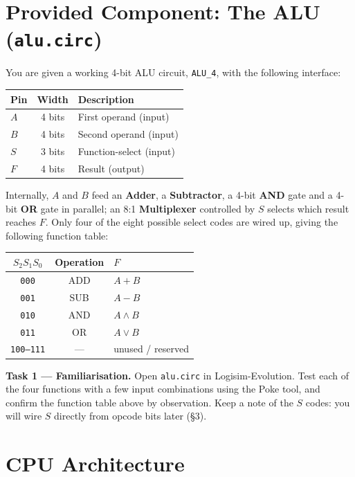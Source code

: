 \documentclass[11pt,a4paper]{article}
\newcommand{\task}[1]{\par\vspace{4pt}\noindent\textbf{Task #1}}
\begin{document}
\section{Provided Component: The ALU (\texttt{alu.circ})}

You are given a working 4-bit ALU circuit, \texttt{ALU\_4}, with the following
interface:

\begin{center}
\begin{tabular}{@{}lcl@{}}
\toprule
\textbf{Pin} & \textbf{Width} & \textbf{Description} \\
\midrule
$A$ & 4 bits & First operand (input) \\
$B$ & 4 bits & Second operand (input) \\
$S$ & 3 bits & Function-select (input) \\
$F$ & 4 bits & Result (output) \\
\bottomrule
\end{tabular}
\end{center}

Internally, $A$ and $B$ feed an \textbf{Adder}, a \textbf{Subtractor}, a 4-bit
\textbf{AND} gate and a 4-bit \textbf{OR} gate in parallel; an 8:1
\textbf{Multiplexer} controlled by $S$ selects which result reaches $F$. Only
four of the eight possible select codes are wired up, giving the following
function table:

\begin{center}
\begin{tabular}{@{}ccl@{}}
\toprule
$S_2 S_1 S_0$ & Operation & $F$ \\
\midrule
\texttt{000} & ADD & $A + B$ \\
\texttt{001} & SUB & $A - B$ \\
\texttt{010} & AND & $A \wedge B$ \\
\texttt{011} & OR  & $A \vee B$ \\
\texttt{100--111} & --- & unused / reserved \\
\bottomrule
\end{tabular}
\end{center}

\task{1 --- Familiarisation.} Open \texttt{alu.circ} in Logisim-Evolution.
Test each of the four functions with a few input combinations using the
Poke tool, and confirm the function table above by observation. Keep a note
of the $S$ codes: you will wire $S$ directly from opcode bits later (\S 3).

\section{CPU Architecture}
\end{document}
